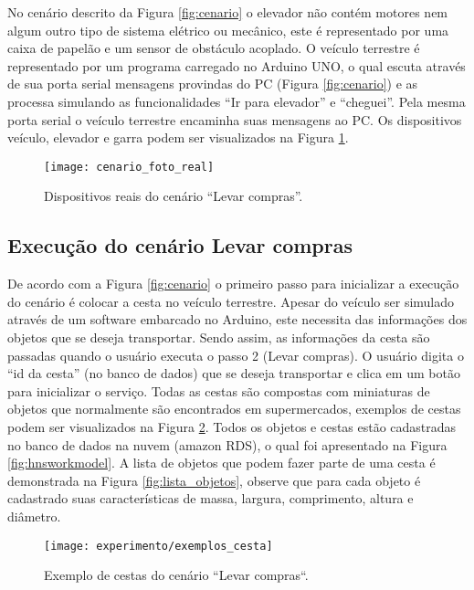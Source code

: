 No cenário descrito da Figura \ref{fig:cenario} o elevador não contém motores nem algum outro tipo de sistema elétrico ou mecânico, este é representado por uma caixa de papelão e um sensor de obstáculo acoplado. O veículo terrestre é representado por um programa carregado no Arduino UNO\footnotemark {}, o qual escuta através de sua porta serial mensagens provindas do PC (Figura \ref{fig:cenario}) e as processa simulando as funcionalidades ``Ir para elevador'' e ``cheguei''. Pela mesma porta serial o veículo terrestre encaminha suas mensagens ao PC. Os dispositivos veículo, elevador e garra podem ser visualizados na Figura \ref{fig:cenario_real}.

\begin{figure}[!htb] \centering 
  \centering
  \texttt{[image: cenario\_foto\_real]} 
  \caption{Dispositivos reais do cenário ``Levar compras''.} 
  \label{fig:cenario_real}
\end{figure}

\subsection{Execução do cenário Levar compras}
De acordo com a Figura \ref{fig:cenario} o primeiro passo para inicializar a execução do cenário é colocar a cesta no veículo terrestre. Apesar do veículo ser simulado através de um software embarcado no Arduino, este necessita das informações dos objetos que se deseja transportar. Sendo assim, as informações da cesta são passadas quando o usuário executa o passo 2 (Levar compras). O usuário digita o ``id da cesta'' (no banco de dados) que se deseja transportar e clica em um botão para inicializar o serviço. Todas as cestas são compostas com miniaturas de objetos que normalmente são encontrados em supermercados, exemplos de cestas podem ser visualizados na Figura \ref{fig:exemplos_cesta}. Todos os objetos e cestas estão cadastradas no banco de dados na nuvem (amazon RDS\footnotemark {}), o qual foi apresentado na Figura \ref{fig:hnsworkmodel}. A lista de objetos que podem fazer parte de uma cesta é demonstrada na Figura \ref{fig:lista_objetos}, observe que para cada objeto é cadastrado suas características de massa, largura, comprimento, altura e diâmetro.

\begin{figure}[!htb] \centering 
  \centering
  \texttt{[image: experimento/exemplos\_cesta]} 
  \caption{Exemplo de cestas do cenário ``Levar compras``.} 
  \label{fig:exemplos_cesta}
\end{figure}

